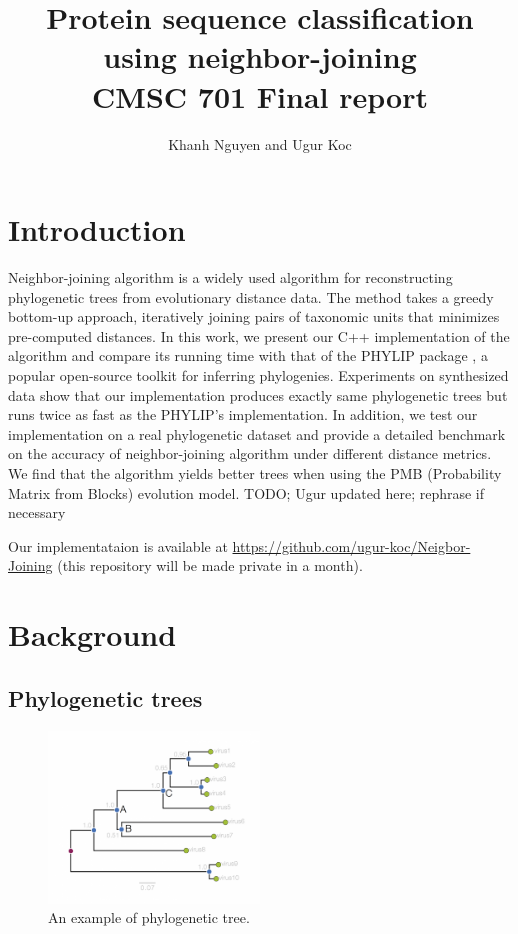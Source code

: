 \documentclass[11pt,letterpaper]{article}
\title{
Protein sequence classification using neighbor-joining\\
   CMSC 701 Final report
}
\author{
	Khanh Nguyen and Ugur Koc
}
\theoremstyle{definition}
\begin{document}
\maketitle

\section{Introduction}

Neighbor-joining algorithm \cite{saitou1987neighbor} is a widely used algorithm for reconstructing phylogenetic trees from evolutionary distance data. The method takes a greedy bottom-up approach, iteratively joining pairs of taxonomic units that minimizes pre-computed distances. In this work, we present our C++ implementation of the algorithm and compare its running time with that of the PHYLIP package \cite{felsenstein2005phylip}, a popular open-source toolkit for inferring phylogenies. Experiments on synthesized data show that our implementation produces exactly same phylogenetic trees but runs twice as fast as the PHYLIP's implementation.  In addition, we test our implementation on a real phylogenetic dataset and provide a detailed benchmark on the accuracy of neighbor-joining algorithm under different distance metrics. We find that the algorithm yields better trees when using the PMB (Probability Matrix from Blocks) evolution model. TODO; Ugur updated here; rephrase if necessary

Our implementataion is available at \url{https://github.com/ugur-koc/Neigbor-Joining} (this repository will be made private in a month).

\section{Background}


\subsection{Phylogenetic trees}

\begin{figure}[t]
  \centering
  \includegraphics[width=0.5\textwidth]{phylogram_1a.png}
  \caption{An example of phylogenetic tree.}
  \label{fig:phytree}
\end{figure}
\end{document}
